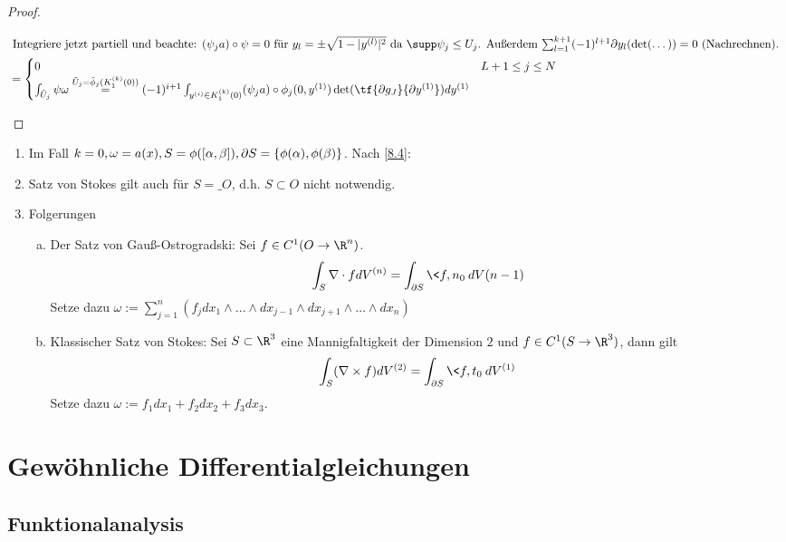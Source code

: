 \documentclass[a4paper,10pt]{scrbook}
\begin{document}
\begin{proof}
\begin{enumerate}[1)]
\begin{align*}
				\intertext{
					Integriere jetzt partiell und beachte: $(\psi_j a)\circ \psi = 0$ für $y_l = \pm \sqrt{1-|y^{(l)}|^2}$ da $\supp \psi_j \le U_j$.
					Außerdem $\sum_{l=1}^{k+1} (-1)^{l+1} \d y_l (\det (\dotsc)) = 0$ (Nachrechnen).
				}
				&= \begin{cases}
					0 & L+1 \le j \le N \\
					\int_{\tilde U_j} \psi \omega \stackrel{\tilde U_j = \tilde \phi_j(K_1^{(k)}(0))}= (-1)^{i+1} \int_{y^{(i)}\in K_1^{(k)}(0)} (\psi_j a) \circ \phi_j (0,y^{(1)}) \det(\tf{\d g_J}{\d y^{(1)}}) dy^{(1)} &
				\end{cases}
			\end{align*}
	\end{enumerate}
\end{proof}

\begin{nt*} \label{8.8}
	\begin{enumerate}[1)]
		\item
			Im Fall $k=0, \omega = a(x), S = \phi([\alpha,\beta]), \partial S = \{\phi(\alpha), \phi(\beta)\}$.
			Nach \ref{8.4}:
		\item
			Satz von Stokes gilt auch für $S= \_{O}$, d.h. $S \subset O$ nicht notwendig.
		\item
			Folgerungen
			\begin{enumerate}[a)]
				\item
					Der Satz von Gauß-Ostrogradski:
					Sei $f\in C^1(O\to \R^n)$.
					\[
						\int_{S} \nabla \cdot f dV^{(n)} = \int_{\d S} \<f,n_0\> dV{(n-1)}
					\]
					Setze dazu $\omega := \sum_{j=1}^n (f_j dx_1 \wedge \dotsc \wedge dx_{j-1} \wedge dx_{j+1} \wedge \dotsc \wedge dx_n)$
				\item
					Klassischer Satz von Stokes:
					Sei $S \subset \R^3$ eine Mannigfaltigkeit der Dimension $2$ und $f \in C^1(S \to \R^3)$, dann gilt
					\[
						\int_S (\nabla \times f) dV^{(2)} = \int_{\d S}\<f,t_0\> dV^{(1)}
					\]
					Setze dazu $\omega := f_1 dx_1 + f_2 dx_2 + f_3 dx_3$.
			\end{enumerate}
	\end{enumerate}
\end{nt*}


\section{Gewöhnliche Differentialgleichungen}


\subsection{Funktionalanalysis}
\end{document}

